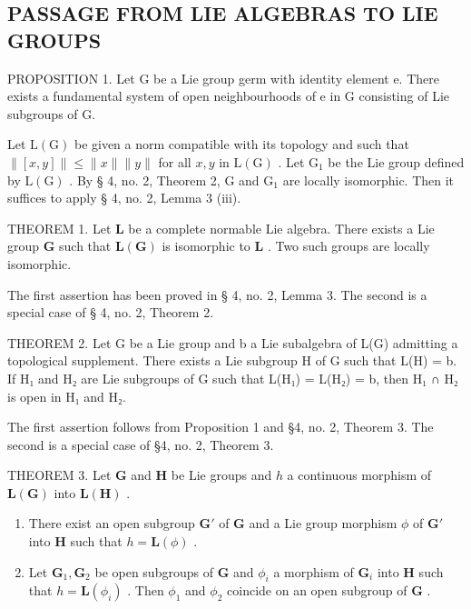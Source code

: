 \subsection{PASSAGE FROM LIE ALGEBRAS TO LIE GROUPS}

PROPOSITION 1. Let G be a Lie group germ with identity element e. There exists a fundamental system of open neighbourhoods of e in G consisting of Lie subgroups of G.

Let \(\mathrm{L}(\mathrm{G})\) be given a norm compatible with its topology and such that \(\| [x,y]\| \leqslant \| x\| \| y\|\) for all \(x,y\) in \(\mathrm{L}(\mathrm{G})\) . Let \(\mathrm{G}_1\) be the Lie group defined by \(\mathrm{L}(\mathrm{G})\) . By § 4, no. 2, Theorem 2, G and \(\mathrm{G}_1\) are locally isomorphic. Then it suffices to apply § 4, no. 2, Lemma 3 (iii).

THEOREM 1. Let \(\mathbf{L}\) be a complete normable Lie algebra. There exists a Lie group \(\mathbf{G}\) such that \(\mathbf{L}(\mathbf{G})\) is isomorphic to \(\mathbf{L}\) . Two such groups are locally isomorphic.

The first assertion has been proved in § 4, no. 2, Lemma 3. The second is a special case of § 4, no. 2, Theorem 2.

THEOREM 2. Let G be a Lie group and b a Lie subalgebra of L(G) admitting a topological supplement. There exists a Lie subgroup H of G such that L(H) = b. If H₁ and H₂ are Lie subgroups of G such that L(H₁) = L(H₂) = b, then H₁ ∩ H₂ is open in H₁ and H₂.

The first assertion follows from Proposition 1 and §4, no. 2, Theorem 3. The second is a special case of §4, no. 2, Theorem 3.

THEOREM 3. Let \(\mathbf{G}\) and \(\mathbf{H}\) be Lie groups and \(h\) a continuous morphism of \(\mathbf{L}(\mathbf{G})\) into \(\mathbf{L}(\mathbf{H})\) .

\begin{enumerate}
\def\labelenumi{(\roman{enumi})}
\item
  There exist an open subgroup \(\mathbf{G}'\) of \(\mathbf{G}\) and a Lie group morphism \(\phi\) of \(\mathbf{G}'\) into \(\mathbf{H}\) such that \(h = \mathbf{L}(\phi)\) .
\item
  Let \(\mathbf{G}_1, \mathbf{G}_2\) be open subgroups of \(\mathbf{G}\) and \(\phi_i\) a morphism of \(\mathbf{G}_i\) into \(\mathbf{H}\) such that \(h = \mathbf{L}(\phi_i)\) . Then \(\phi_1\) and \(\phi_2\) coincide on an open subgroup of \(\mathbf{G}\) .
\end{enumerate}


